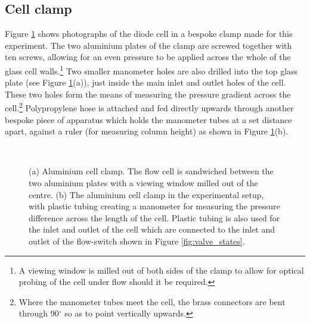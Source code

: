 \subsection{Cell clamp}
Figure \ref{fig:case} shows photographs of the diode cell in a bespoke clamp made for this experiment. The two aluminium plates of the clamp are screwed together with ten screws, allowing for an even pressure to be applied across the whole of the glass cell walls.\footnote{A viewing window is milled out of both sides of the clamp to allow for optical probing of the cell under flow should it be required.} Two smaller manometer holes are also drilled into the top glass plate (see Figure \ref{fig:case}(a)), just inside the main inlet and outlet holes of the cell. These two holes form the means of measuring the pressure gradient across the cell.\footnote{Where the manometer tubes meet the cell, the brass connectors are bent through 90$^{\circ}$ so as to point vertically upwards.} Polypropylene hose is attached and fed directly upwards through another bespoke piece of apparatus which holds the manometer tubes at a set distance apart, against a ruler (for measuring column height) as shown in Figure \ref{fig:case}(b).

\begin{figure}
\begin{center}
\\
\end{center}
\caption[Aluminium cell clamp]{\label{fig:case}(a) Aluminium cell clamp. The flow cell is sandwiched between the two aluminium plates with a viewing window milled out of the centre. (b) The aluminium cell clamp in the experimental setup, with plastic tubing creating a manometer for measuring the pressure difference across the length of the cell. Plastic tubing is also used for the inlet and outlet of the cell which are connected to the inlet and outlet of the flow-switch shown in Figure \ref{fig:valve_states}.}
\end{figure}

